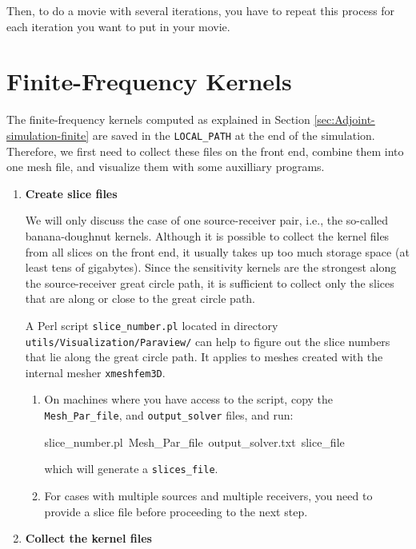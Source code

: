 \bigskip

Then, to do a movie with several iterations, you have to repeat this process for each iteration you want to put in your movie.

\section{Finite-Frequency Kernels}\label{sec:Finite-Frequency-Kernels}

The finite-frequency kernels computed as explained in Section \ref{sec:Adjoint-simulation-finite}
are saved in the \texttt{LOCAL\_PATH} at the end of the simulation.
Therefore, we first need to collect these files on the front end,
combine them into one mesh file, and visualize them with some auxilliary
programs.
\begin{enumerate}
\item \textbf{Create slice files}


We will only discuss the case of one source-receiver pair, i.e., the
so-called banana-doughnut kernels. Although it is possible to collect
the kernel files from all slices on the front end, it usually takes
up too much storage space (at least tens of gigabytes). Since the
sensitivity kernels are the strongest along the source-receiver great
circle path, it is sufficient to collect only the slices that are
along or close to the great circle path.


A Perl script \texttt{slice\_number.pl} located in directory \texttt{utils/Visualization/Paraview/}
can help to figure out the slice numbers that lie along the great
circle path. It applies to meshes created with the internal mesher
\texttt{xmeshfem3D}.
\begin{enumerate}
\item On machines where you have access to the script, copy the \texttt{Mesh\_Par\_file},
and \texttt{output\_solver} files, and run:

\begin{lyxcode}
{\small slice\_number.pl~Mesh\_Par\_file~output\_solver.txt~slice\_file}{\small \par}
\end{lyxcode}

which will generate a \texttt{slices\_file}.

\item For cases with multiple sources and multiple receivers, you need to
provide a slice file before proceeding to the next step.
\end{enumerate}
\item \textbf{Collect the kernel files}



\end{enumerate}
